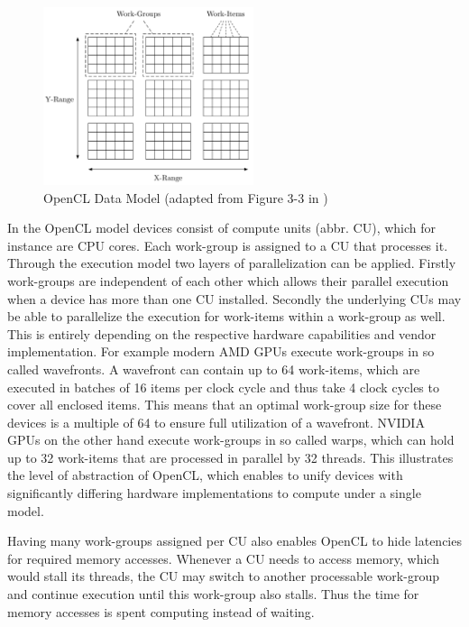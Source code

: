 \begin{figure}[!htb]	
	\includegraphics[width=0.55\textwidth]{drawings/opencl_data_model.pdf}
	\centering
	\caption{OpenCL Data Model (adapted from Figure 3-3 in \cite{opencl_spec})}
	\label{img:opencl_data_model}
\end{figure}

In the OpenCL model devices consist of compute units (abbr. CU), which for instance are CPU cores. Each work-group is assigned to a CU that processes it. Through the execution model two layers of parallelization can be applied. Firstly work-groups are independent of each other which allows their parallel execution when a device has more than one CU installed. Secondly the underlying CUs may be able to parallelize the execution for work-items within a work-group as well. This is entirely depending on the respective hardware capabilities and vendor implementation. For example modern AMD GPUs execute work-groups in so called wavefronts. A wavefront can contain up to 64 work-items, which are executed in batches of 16 items per clock cycle and thus take 4 clock cycles to cover all enclosed items\cite{amd_opencl_spec}. This means that an optimal work-group size for these devices is a multiple of 64 to ensure full utilization of a wavefront.
NVIDIA GPUs on the other hand execute work-groups in so called warps, which can hold up to 32 work-items that are processed in parallel by 32 threads\cite{nvidia_pascal_spec}. This illustrates the level of abstraction of OpenCL, which enables to unify devices with significantly differing hardware implementations to compute under a single model.

Having many work-groups assigned per CU also enables OpenCL to hide latencies for required memory accesses. Whenever a CU needs to access memory, which would stall its threads, the CU may switch to another processable work-group and continue execution until this work-group also stalls. Thus the time for memory accesses is spent computing instead of waiting.

